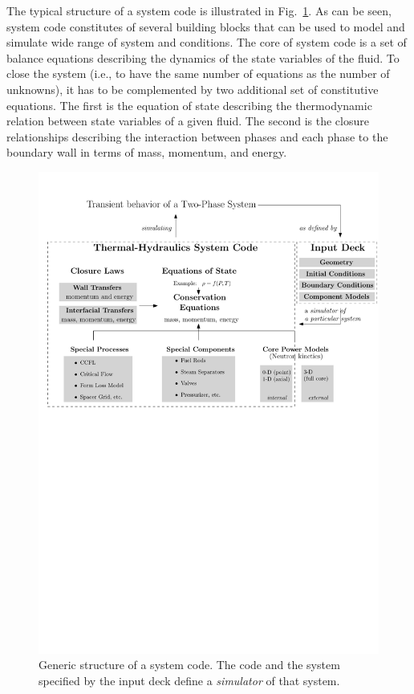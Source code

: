 The typical structure of a system code is illustrated in Fig.~\ref{fig:ch1_th_system_code}.
As can be seen, system code constitutes of several building blocks that can be used to model and simulate wide range of system and conditions.
The core of system code is a set of balance equations describing the dynamics of the state variables of the fluid.
To close the system (i.e., to have the same number of equations as the number of unknowns), it has to be complemented by two additional set of constitutive equations.
The first is the equation of state describing the thermodynamic relation between state variables of a given fluid.
The second is the closure relationships describing the interaction between phases and each phase to the boundary wall in terms of mass, momentum, and energy. 
\begin{figure}[bth]	
	\centering
	\includegraphics[width=\textwidth]{../figures/chapter1/figures/th_system_code}
	\caption[Generic structure of a thermal-hydraulics (TH) system code]{Generic structure of a  system code. The code and the system specified by the input deck define a \emph{simulator} of that system.}
	\label{fig:ch1_th_system_code}
\end{figure}


